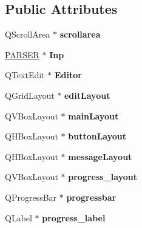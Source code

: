 \subsection*{Public Attributes}
\begin{DoxyCompactItemize}
\item 
\hypertarget{classDockWidget_a473cd58825343713560b9817cf4c8e19}{
QScrollArea $\ast$ {\bfseries scrollarea}}
\label{classDockWidget_a473cd58825343713560b9817cf4c8e19}

\item 
\hypertarget{classDockWidget_a539c01da01b9127994949394a27ab3bc}{
\hyperlink{classPARSER}{PARSER} $\ast$ {\bfseries Inp}}
\label{classDockWidget_a539c01da01b9127994949394a27ab3bc}

\item 
\hypertarget{classDockWidget_a494106b267196cf5315a0b0afe50dee8}{
QTextEdit $\ast$ {\bfseries Editor}}
\label{classDockWidget_a494106b267196cf5315a0b0afe50dee8}

\item 
\hypertarget{classDockWidget_abc7c184f3c38db794ce6385962572dcd}{
QGridLayout $\ast$ {\bfseries editLayout}}
\label{classDockWidget_abc7c184f3c38db794ce6385962572dcd}

\item 
\hypertarget{classDockWidget_ab6f3cf5cfdccd21fdb6d2d6e97166a9c}{
QVBoxLayout $\ast$ {\bfseries mainLayout}}
\label{classDockWidget_ab6f3cf5cfdccd21fdb6d2d6e97166a9c}

\item 
\hypertarget{classDockWidget_aeaa9d51d5e3daaf50b8a3015e43bfcb5}{
QHBoxLayout $\ast$ {\bfseries buttonLayout}}
\label{classDockWidget_aeaa9d51d5e3daaf50b8a3015e43bfcb5}

\item 
\hypertarget{classDockWidget_adc164fb7fee2d556c03d7aba148ad92e}{
QHBoxLayout $\ast$ {\bfseries messageLayout}}
\label{classDockWidget_adc164fb7fee2d556c03d7aba148ad92e}

\item 
\hypertarget{classDockWidget_a13bc1675428a302b0856fca562a02fb5}{
QVBoxLayout $\ast$ {\bfseries progress\_\-layout}}
\label{classDockWidget_a13bc1675428a302b0856fca562a02fb5}

\item 
\hypertarget{classDockWidget_a78dd9d580ddb82d5b756230b9f543b82}{
QProgressBar $\ast$ {\bfseries progressbar}}
\label{classDockWidget_a78dd9d580ddb82d5b756230b9f543b82}

\item 
\hypertarget{classDockWidget_a1b7c261ce24033cda7f3640a2b927d10}{
QLabel $\ast$ {\bfseries progress\_\-label}}
\label{classDockWidget_a1b7c261ce24033cda7f3640a2b927d10}


\end{DoxyCompactItemize}

